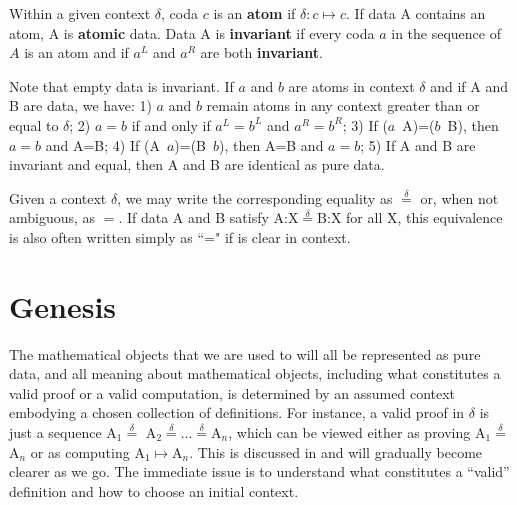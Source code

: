 \documentclass[11pt]{article}
\begin{document}
\begin{definition}
{Within a given context $\delta$, coda $c$ is an {\bf atom} if $\delta:c\mapsto c$.  If data A contains an atom, A is {\bf atomic} data. 
Data A is {\bf invariant} if every coda $a$ in the sequence of $A$ is an atom and if $a^L$ and $a^R$ are both {\bf invariant}. }
\end{definition}
\noindent Note that empty data is invariant.  If $a$ and $b$ are atoms in context $\delta$ and if A and B are data, we have: 
1) $a$ and $b$ remain atoms in any context greater than or equal to $\delta$; 2) $a=b$ if and only if $a^L=b^L$ and $a^R=b^R$; 3) If ($a$\ A)=($b$\ B), then $a=b$ and A=B; 
4) If (A\ $a$)=(B\ $b$), then A=B and $a=b$; 5) If A and B are invariant and equal, then A and B are identical as pure data. 

Given a context $\delta$, we may write the corresponding equality as ${\overset \delta =}$ or, when not ambiguous, as $=$. 
If data A and B satisfy A:X${\overset \delta =}$B:X for all X, this equivalence is also often written simply as ``=" if is clear in context.  

\section{Genesis}

    The mathematical objects that we are used to will all be represented as pure data, and all meaning about mathematical objects, including what constitutes a valid proof or a valid computation, is determined by an assumed context embodying a chosen collection of definitions.  For instance, a valid proof in $\delta$ is just a sequence 
A$_1{\overset \delta =}$ A$_2 {\overset \delta =} \dots {\overset \delta =} $A$_n$, 
 which can be viewed either as proving A$_1{\overset \delta =}$A$_n$ or as computing A$_1\mapsto$A$_n$.
This is discussed in \cite{PDF} and will gradually become clearer as we go.  The immediate issue is to understand what constitutes a ``valid'' definition and how to choose an initial context.     
    
\end{document}
